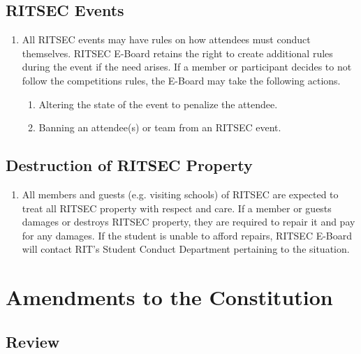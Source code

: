 \documentclass{article}
\begin{document}
\subsection{RITSEC Events}

\begin{enumerate}
  \item All RITSEC events may have rules on how attendees must conduct
    themselves. RITSEC E-Board retains the right to create additional rules
    during the event if the need arises. If a member or participant decides to
    not follow the competitions rules, the E-Board may take the following
    actions. 
  \begin{enumerate}
    \item Altering the state of the event to penalize the attendee.
    \item Banning an attendee(s) or team from an RITSEC event.
  \end{enumerate}
\end{enumerate}

\subsection{Destruction of RITSEC Property}

\begin{enumerate}
  \item All members and guests (e.g. visiting schools) of RITSEC are expected
    to treat all RITSEC property with respect and care. If a member or guests
    damages or destroys RITSEC property, they are required to repair it and pay
    for any damages. If the student is unable to afford repairs, RITSEC E-Board
    will contact RIT’s Student Conduct Department pertaining to the situation.
\end{enumerate}


\section{Amendments to the Constitution}

\subsection{Review}
\end{document}
